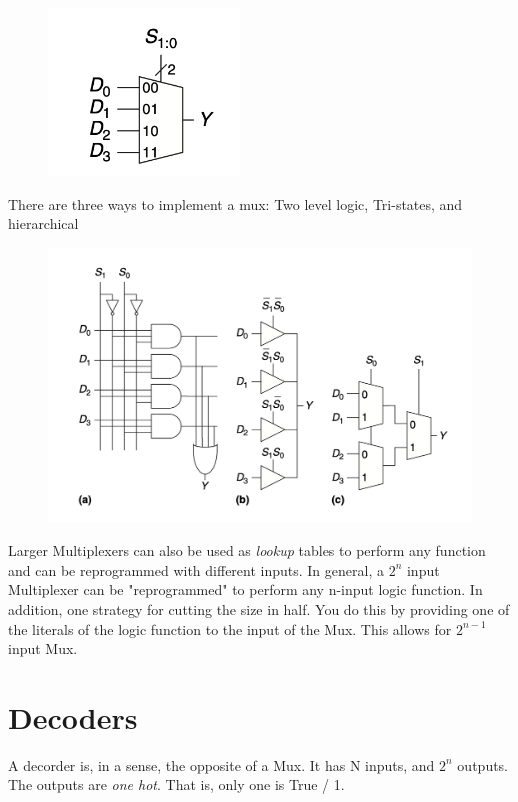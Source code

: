 \documentclass[12pt]{report}
\begin{document}
\begin{figure}[h!]
  \centering
  \includegraphics[width=2in]{4-bit-mux.png}
\end{figure}

\noindent There are three ways to implement a mux: Two level logic, Tri-states, and hierarchical

\begin{figure}[h!]
  \centering
  \includegraphics[width=6in]{n-bit-mux-implementation.png}
\end{figure}

\noindent Larger Multiplexers can also be used as \textit{lookup} tables to perform any function and can be reprogrammed with different inputs. 
In general, a $2^n$ input Multiplexer can be "reprogrammed" to perform any n-input logic function. In addition, one strategy for cutting the size in
half. You do this by providing one of the literals of the logic function to the input of the Mux. This allows for $2^{n-1}$ input Mux. 

\pagebreak

\section{Decoders}
A decorder is, in a sense, the opposite of a Mux. It has N inputs, and $2^n$ outputs. The outputs are \textit{one hot}. That is, only one is 
True / 1. 
\end{document}
